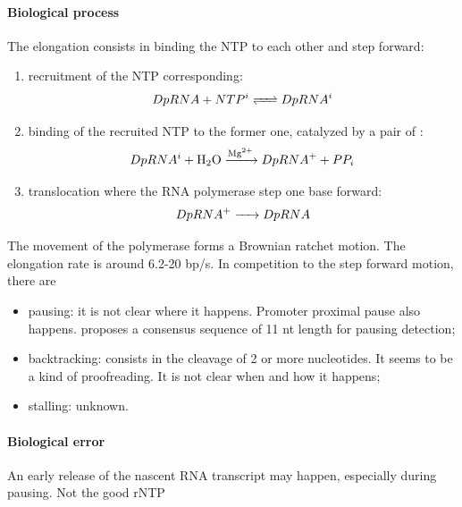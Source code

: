 \paragraph{Biological process} The elongation consists in binding the NTP to each other and step forward:
\begin{enumerate}
  \item recruitment of the NTP corresponding:
    $$
      \reactionRev{DpRNA + NTP^i}{DpRNA^i}{}{} \\
    $$
  \item binding of the recruited NTP to the former one, catalyzed by a pair of :
    $$
      \reactionIrr{DpRNA^i + \ce{H2O}}{DpRNA^+ + PP_i}{\ce{Mg^2+}}{} \\
    $$
  \item translocation where the RNA polymerase step one base forward:
    $$
      \reactionIrr{DpRNA^+}{DpRNA}{}{} \\
    $$
\end{enumerate}
The movement of the polymerase forms a Brownian ratchet motion. The elongation rate is around 6.2-20 bp/s. In competition to the step forward motion, there are
\begin{itemize}
  \item pausing: it is not clear where it happens. Promoter proximal pause also happens. \citep{LaW+:14} proposes a consensus sequence of 11 nt length for pausing detection;
  \item backtracking: consists in the cleavage of 2 or more nucleotides. It seems to be a kind of proofreading. It is not clear when and how it happens;
  \item stalling: unknown.
\end{itemize}


\paragraph{Biological error} An early release of the nascent RNA transcript may happen, especially during pausing.
Not the good rNTP

